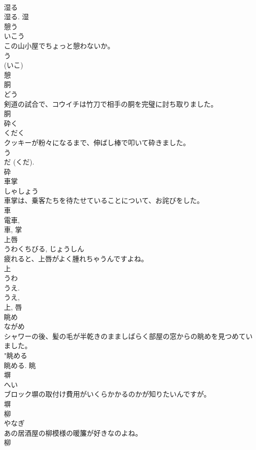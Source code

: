 \documentclass[8pt]{extreport}
\begin{document}
\begin{CJK}{UTF8}{min}
\\	湿る 
\\	湿る.	湿	
\\	憩う	
\\	いこう	
\\	この山小屋でちょっと憩わないか。	
\\	う 
\\	(いこ) 
\\	憩	
\\	胴	
\\	どう	
\\	剣道の試合で、コウイチは竹刀で相手の胴を完璧に討ち取りました。	
\\	胴	
\\	砕く	
\\	くだく	
\\	クッキーが粉々になるまで、伸ばし棒で叩いて砕きました。	
\\	う 
\\	だ (くだ). 
\\	砕	
\\	車掌	
\\	しゃしょう	
\\	車掌は、乗客たちを待たせていることについて、お詫びをした。	
\\	車 
\\	電車, 
\\	車, 掌	
\\	上唇	
\\	うわくちびる, じょうしん	
\\	疲れると、上唇がよく腫れちゃうんですよね。	
\\	上 
\\	うわ 
\\	うえ. 
\\	うえ, 
\\	上, 唇	
\\	眺め	
\\	ながめ	
\\	シャワーの後、髪の毛が半乾きのまましばらく部屋の窓からの眺めを見つめていました。	
\\	"眺める 
\\	眺める.	眺	
\\	塀	
\\	へい	
\\	ブロック塀の取付け費用がいくらかかるのかが知りたいんですが。	
\\	塀	
\\	柳	
\\	やなぎ	
\\	あの居酒屋の柳模様の暖簾が好きなのよね。	
\\	柳	

\end{CJK}
\end{document}
